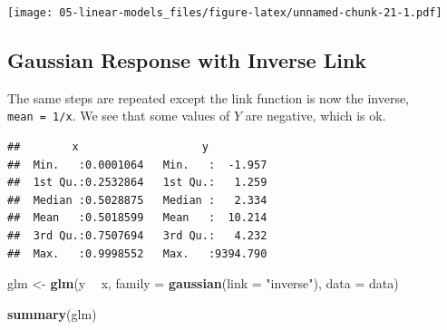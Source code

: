 \documentclass[openany]{book}
\newenvironment{Shaded}{\begin{snugshade}}{\end{snugshade}}
\newcommand{\ControlFlowTok}[1]{\textcolor[rgb]{0.13,0.29,0.53}{\textbf{#1}}}
\newcommand{\DataTypeTok}[1]{\textcolor[rgb]{0.13,0.29,0.53}{#1}}
\newcommand{\DecValTok}[1]{\textcolor[rgb]{0.00,0.00,0.81}{#1}}
\newcommand{\KeywordTok}[1]{\textcolor[rgb]{0.13,0.29,0.53}{\textbf{#1}}}
\newcommand{\NormalTok}[1]{#1}
\newcommand{\OperatorTok}[1]{\textcolor[rgb]{0.81,0.36,0.00}{\textbf{#1}}}
\newcommand{\StringTok}[1]{\textcolor[rgb]{0.31,0.60,0.02}{#1}}
\begin{document}
\texttt{[image: 05-linear-models\_files/figure-latex/unnamed-chunk-21-1.pdf]}

\hypertarget{gaussian-response-with-inverse-link}{%
\subsection{Gaussian Response with Inverse Link}\label{gaussian-response-with-inverse-link}}

The same steps are repeated except the link function is now the inverse, \texttt{mean\ =\ 1/x}. We see that some values of \(Y\) are negative, which is ok.

\begin{Shaded}
\end{Shaded}

\begin{verbatim}
##        x                   y           
##  Min.   :0.0001064   Min.   :  -1.957  
##  1st Qu.:0.2532864   1st Qu.:   1.259  
##  Median :0.5028875   Median :   2.334  
##  Mean   :0.5018599   Mean   :  10.214  
##  3rd Qu.:0.7507694   3rd Qu.:   4.232  
##  Max.   :0.9998552   Max.   :9394.790
\end{verbatim}

\begin{Shaded}
\begin{Highlighting}[]
\NormalTok{glm <-}\StringTok{ }\KeywordTok{glm}\NormalTok{(y }\OperatorTok{~}\StringTok{ }\NormalTok{x, }\DataTypeTok{family =} \KeywordTok{gaussian}\NormalTok{(}\DataTypeTok{link =} \StringTok{"inverse"}\NormalTok{), }\DataTypeTok{data =}\NormalTok{ data)}

\KeywordTok{summary}\NormalTok{(glm)}
\end{Highlighting}
\end{Shaded}
\end{document}
